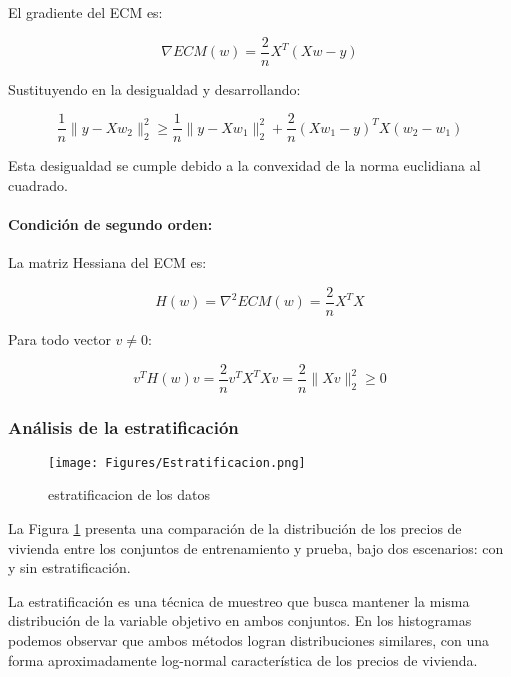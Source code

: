 \documentclass{tp02}
\begin{document}
El gradiente del ECM es:

\begin{equation}
\nabla ECM(w) = \frac{2}{n}X^T(Xw - y)
\end{equation}

Sustituyendo en la desigualdad y desarrollando:

\begin{equation}
\frac{1}{n}\|y - Xw_2\|^2_2 \geq \frac{1}{n}\|y - Xw_1\|^2_2 + 
\frac{2}{n}(Xw_1 - y)^TX(w_2 - w_1)
\end{equation}

Esta desigualdad se cumple debido a la convexidad de la norma euclidiana 
al cuadrado.

\paragraph{Condición de segundo orden:}
La matriz Hessiana del ECM es:

\begin{equation}
H(w) = \nabla^2 ECM(w) = \frac{2}{n}X^TX
\end{equation}

Para todo vector $v \neq 0$:

\begin{equation}
v^TH(w)v = \frac{2}{n}v^TX^TXv = \frac{2}{n}\|Xv\|^2_2 \geq 0
\end{equation}


\subsubsection{Análisis de la estratificación}

\begin{figure}[H]
    \centering
    \texttt{[image: Figures/Estratificacion.png]}
    \caption{estratificacion de los datos}
    \label{fig:estratificacion}
    \end{figure}



La Figura \ref{fig:estratificacion} presenta una comparación de la 
distribución de los precios de vivienda entre los conjuntos de 
entrenamiento y prueba, bajo dos escenarios: con y sin estratificación. 

La estratificación es una técnica de muestreo que busca mantener la 
misma distribución de la variable objetivo en ambos conjuntos. En los 
histogramas podemos observar que ambos métodos logran distribuciones 
similares, con una forma aproximadamente log-normal característica de 
los precios de vivienda.
\end{document}

